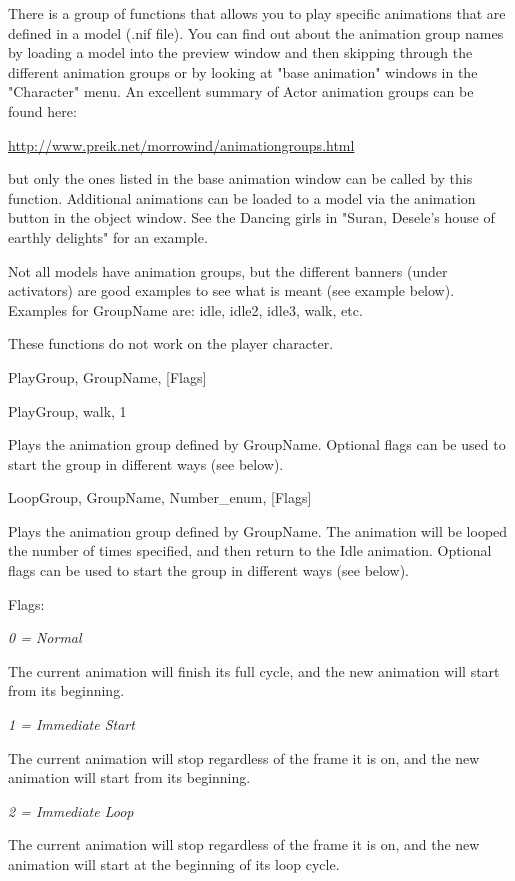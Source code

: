 There is a group of functions that allows you to play specific
animations that are defined in a model (.nif file). You can find out
about the animation group names by loading a model into the preview
window and then skipping through the different animation groups or by
looking at "base animation" windows in the "Character" menu. An
excellent summary of Actor animation groups can be found here:

\href{http://morrowind.preik.net/animationgroups.html}{http://www.preik.net/morrowind/animationgroups.html}

but only the ones listed in the base animation window can be called by
this function. Additional animations can be loaded to a model via the
animation button in the object window. See the Dancing girls in "Suran,
Desele's house of earthly delights" for an example.

Not all models have animation groups, but the different banners (under
activators) are good examples to see what is meant (see example below).
Examples for GroupName are: idle, idle2, idle3, walk, etc.

These functions do not work on the player character.

PlayGroup, GroupName, {[}Flags{]}

PlayGroup, walk, 1

Plays the animation group defined by GroupName. Optional flags can be
used to start the group in different ways (see below).

LoopGroup, GroupName, Number\_enum, {[}Flags{]}

Plays the animation group defined by GroupName. The animation will be
looped the number of times specified, and then return to the Idle
animation. Optional flags can be used to start the group in different
ways (see below).

Flags:

\emph{0 = Normal}

The current animation will finish its full cycle, and the new animation
will start from its beginning.

\emph{1 = Immediate Start}

The current animation will stop regardless of the frame it is on, and
the new animation will start from its beginning.

\emph{2 = Immediate Loop}

The current animation will stop regardless of the frame it is on, and
the new animation will start at the beginning of its loop cycle.

